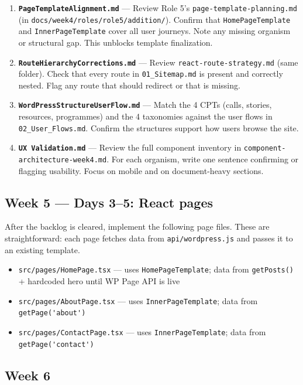 \documentclass[11pt,a4paper]{article}
\begin{document}
\begin{enumerate}
\item \textbf{\nolinkurl{PageTemplateAlignment.md}} — Review Role 5's \nolinkurl{page-template-planning.md} (in \nolinkurl{docs/week4/roles/role5/addition/}). Confirm that \nolinkurl{HomePageTemplate} and \nolinkurl{InnerPageTemplate} cover all user journeys. Note any missing organism or structural gap. This unblocks template finalization.
\item \textbf{\nolinkurl{RouteHierarchyCorrections.md}} — Review \nolinkurl{react-route-strategy.md} (same folder). Check that every route in \nolinkurl{01_Sitemap.md} is present and correctly nested. Flag any route that should redirect or that is missing.
\item \textbf{\nolinkurl{WordPressStructureUserFlow.md}} — Match the 4 CPTs (calls, stories, resources, programmes) and the 4 taxonomies against the user flows in \nolinkurl{02_User_Flows.md}. Confirm the structures support how users browse the site.
\item \textbf{\nolinkurl{UX Validation.md}} — Review the full component inventory in \nolinkurl{component-architecture-week4.md}. For each organism, write one sentence confirming or flagging usability. Focus on mobile and on document-heavy sections.
\end{enumerate}

\subsection{Week 5 — Days 3–5: React pages}

After the backlog is cleared, implement the following page files. These are straightforward: each page fetches data from \nolinkurl{api/wordpress.js} and passes it to an existing template.

\begin{itemize}
\item \nolinkurl{src/pages/HomePage.tsx} — uses \nolinkurl{HomePageTemplate}; data from \nolinkurl{getPosts()} + hardcoded hero until WP Page API is live
\item \nolinkurl{src/pages/AboutPage.tsx} — uses \nolinkurl{InnerPageTemplate}; data from \nolinkurl{getPage('about')}
\item \nolinkurl{src/pages/ContactPage.tsx} — uses \nolinkurl{InnerPageTemplate}; data from \nolinkurl{getPage('contact')}
\end{itemize}

\subsection{Week 6}
\end{document}
